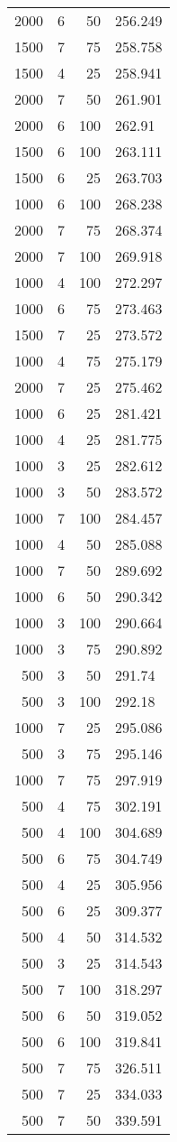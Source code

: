 \begin{tabular}{rrrl}
2000 & 6 & 50 & 256.249 \\
1500 & 7 & 75 & 258.758 \\
1500 & 4 & 25 & 258.941 \\
2000 & 7 & 50 & 261.901 \\
2000 & 6 & 100 & 262.91 \\
1500 & 6 & 100 & 263.111 \\
1500 & 6 & 25 & 263.703 \\
1000 & 6 & 100 & 268.238 \\
2000 & 7 & 75 & 268.374 \\
2000 & 7 & 100 & 269.918 \\
1000 & 4 & 100 & 272.297 \\
1000 & 6 & 75 & 273.463 \\
1500 & 7 & 25 & 273.572 \\
1000 & 4 & 75 & 275.179 \\
2000 & 7 & 25 & 275.462 \\
1000 & 6 & 25 & 281.421 \\
1000 & 4 & 25 & 281.775 \\
1000 & 3 & 25 & 282.612 \\
1000 & 3 & 50 & 283.572 \\
1000 & 7 & 100 & 284.457 \\
1000 & 4 & 50 & 285.088 \\
1000 & 7 & 50 & 289.692 \\
1000 & 6 & 50 & 290.342 \\
1000 & 3 & 100 & 290.664 \\
1000 & 3 & 75 & 290.892 \\
500 & 3 & 50 & 291.74 \\
500 & 3 & 100 & 292.18 \\
1000 & 7 & 25 & 295.086 \\
500 & 3 & 75 & 295.146 \\
1000 & 7 & 75 & 297.919 \\
500 & 4 & 75 & 302.191 \\
500 & 4 & 100 & 304.689 \\
500 & 6 & 75 & 304.749 \\
500 & 4 & 25 & 305.956 \\
500 & 6 & 25 & 309.377 \\
500 & 4 & 50 & 314.532 \\
500 & 3 & 25 & 314.543 \\
500 & 7 & 100 & 318.297 \\
500 & 6 & 50 & 319.052 \\
500 & 6 & 100 & 319.841 \\
500 & 7 & 75 & 326.511 \\
500 & 7 & 25 & 334.033 \\
500 & 7 & 50 & 339.591 \\
\bottomrule
\end{tabular}
